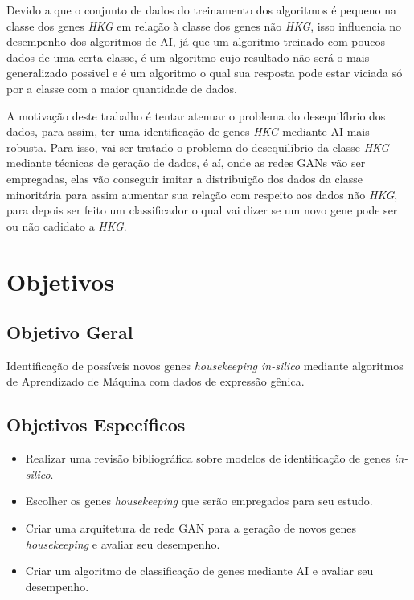 \documentclass[
	12pt,				%
	openright,			%
	oneside,			%
	a4paper,			%
	english,			%
	brazil				%
	]{abntex2}
\begin{document}
Devido a que o conjunto de dados do treinamento dos algoritmos é pequeno na classe dos genes \textit{HKG} em relação à classe dos genes não \textit{HKG}, isso influencia no desempenho dos algoritmos de AI, já que um algoritmo treinado com poucos dados de uma certa classe, é um algoritmo cujo resultado não será o mais generalizado possivel e é um algoritmo o qual sua resposta pode estar viciada só por a classe com a maior quantidade de dados.

A motivação deste trabalho é tentar atenuar o problema do desequilíbrio dos dados, para assim, ter uma identificação de genes \textit{HKG} mediante AI mais robusta. Para isso, vai ser tratado o problema do desequilíbrio da classe \textit{HKG} mediante técnicas de geração de dados, é aí, onde as redes GANs vão ser empregadas, elas vão conseguir imitar a distribuição dos dados da classe minoritária para assim aumentar sua relação com respeito aos dados não \textit{HKG}, para depois ser feito um classificador o qual vai dizer se um novo gene pode ser ou não cadidato a \textit{HKG}.

\section{Objetivos}

\subsection{Objetivo Geral}
Identificação de possíveis novos genes \textit{housekeeping in-silico} mediante algoritmos de Aprendizado de Máquina com dados de expressão gênica.

\subsection{Objetivos Específicos}
\begin{itemize}
    \item Realizar uma revisão bibliográfica sobre modelos de identificação de genes \textit{in-silico}.
    \item Escolher os genes \textit{housekeeping} que serão empregados para seu estudo.
    \item Criar uma arquitetura de rede GAN para a geração de novos genes \textit{housekeeping} e avaliar seu desempenho.
    \item Criar um algoritmo de classificação de genes mediante AI e avaliar seu desempenho.
\end{itemize}
\end{document}
